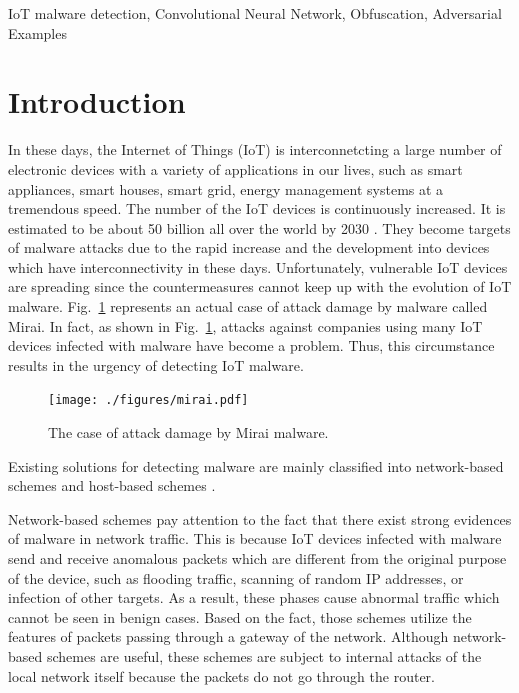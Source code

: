 \documentclass{ieeeaccess}
\newcommand{\myfigurename}{Fig.}
\begin{document}
\begin{keywords} 
 IoT malware detection, Convolutional Neural Network, Obfuscation, Adversarial Examples 
 \end{keywords}

\titlepgskip=-15pt

\maketitle

\section{Introduction}  \label{sec:introduction}
In these days, the Internet of Things (IoT) is interconnetcting a large number of electronic devices with a variety of applications in our lives, such as smart appliances, smart houses, smart grid, energy management systems at a tremendous speed.
The number of the IoT devices is continuously increased.
It is estimated to be about 50 billion all over the world by 2030 \cite{bg1, bg2}.
They become targets of malware attacks due to the rapid increase and the development into devices which have interconnectivity in these days.
Unfortunately, vulnerable IoT devices are spreading since the countermeasures cannot keep up with the evolution of IoT malware.
\myfigurename~\ref{fig:mirai} represents an actual case of attack damage by malware called Mirai.
In fact, as shown in \myfigurename~\ref{fig:mirai}, attacks against companies using many IoT devices infected with malware have become a problem.
Thus, this circumstance results in the urgency of detecting IoT malware.

\begin{figure}[t]
 \centering
 \texttt{[image: ./figures/mirai.pdf]}
 \caption{The case of attack damage by Mirai malware.} 
 \label{fig:mirai}
\end{figure}
Existing solutions for detecting malware are mainly classified into network-based schemes \cite{zako, diot, net} and host-based schemes \cite{om, hwang, cfg, cfg2}.

Network-based schemes pay attention to the fact that there exist strong evidences of malware in network traffic.
This is because IoT devices infected with malware send and receive anomalous packets which are different from the original purpose of the device, such as flooding traffic, scanning of random IP addresses, or infection of other targets.
As a result, these phases cause abnormal traffic which cannot be seen in benign cases.
Based on the fact, those schemes utilize the features of packets passing through a gateway of the network.
Although network-based schemes are useful, these schemes are subject to internal attacks of the local network itself because the packets do not go through the router.
\end{document}

